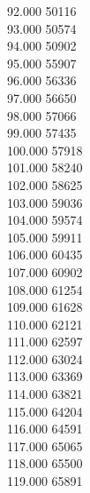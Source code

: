 { 92.000	50116 \\
 93.000	50574 \\
 94.000	50902 \\
 95.000	55907 \\
 96.000	56336 \\
 97.000	56650 \\
 98.000	57066 \\
 99.000	57435 \\
 100.000	57918 \\
 101.000	58240 \\
 102.000	58625 \\
 103.000	59036 \\
 104.000	59574 \\
 105.000	59911 \\
 106.000	60435 \\
 107.000	60902 \\
 108.000	61254 \\
 109.000	61628 \\
 110.000	62121 \\
 111.000	62597 \\
 112.000	63024 \\
 113.000	63369 \\
 114.000	63821 \\
 115.000	64204 \\
 116.000	64591 \\
 117.000	65065 \\
 118.000	65500 \\
 119.000	65891 \\
}
